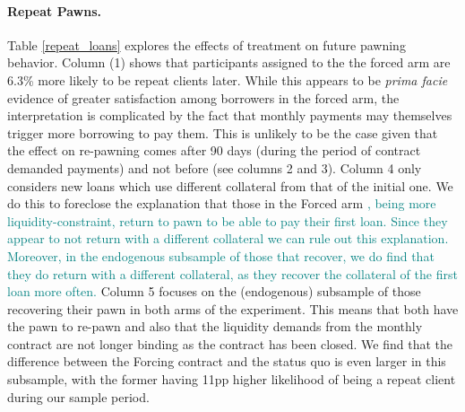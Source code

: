 \documentclass[oneside,11pt]{article}
\begin{document}
\paragraph{Repeat Pawns.}
Table \ref{repeat_loans} explores the effects of treatment on future pawning behavior.
Column (1) shows that participants assigned to the the forced arm are 6.3\% more likely to be repeat clients later. %
While this appears to be \emph{prima facie} evidence of greater satisfaction among borrowers in the forced arm, the interpretation is complicated by the fact that monthly payments may themselves trigger more borrowing to pay them. This is unlikely to be the case given that the effect on re-pawning comes after 90 days (during the period of contract demanded payments) and not before  (see columns 2 and 3). Column 4 only considers new loans which use different collateral from that of the initial one. We do this to foreclose the explanation that those in the Forced arm \textcolor{teal}{, being more liquidity-constraint, return to pawn to be able to pay their first loan. Since they appear to not return with a different collateral we can rule out this explanation. Moreover, in the endogenous subsample of those that recover, we do find that they do return with a different collateral, as they recover the collateral of the first loan more often.}  Column 5 focuses on the (endogenous) subsample of those recovering their pawn in both arms of the experiment. This means that both have the pawn to re-pawn and also that the liquidity demands from the monthly contract are not longer binding as the contract has been closed. We find that the difference between the Forcing contract and the status quo is even larger in this subsample, with the former having 11pp higher likelihood of being a repeat client during our sample period.
\end{document}
